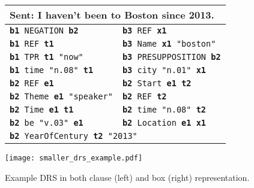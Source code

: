 \documentclass[11pt,a4paper]{article}
\newcommand{\clause}[1]{\texttt{#1}}
\newcommand{\disvar}[1]{\textbf{#1}}
\newcommand{\boxvar}[1]{\textbf{#1}}
\newcommand{\operator}[1]{#1}
\newcommand{\concept}[1]{#1}
\newcommand{\role}[1]{#1}
\begin{document}
\begin{figure*}[!t]
\captionsetup{singlelinecheck=false,justification=justified}
\begin{minipage}[t]{.25\linewidth}
\vspace{0pt}
\setlength{\tabcolsep}{2pt}
\centering
\footnotesize
\begin{tabular}{ll}
\toprule
\multicolumn{2}{l}{\small \textbf{Sent:} I haven't been to Boston since 2013.} \\
\midrule
\clause{\boxvar{b1} \operator{NEGATION} \boxvar{b2}}      &\clause{\boxvar{b3} \operator{REF} \disvar{x1}}    \\
\clause{\boxvar{b1} \operator{REF} \disvar{t1}}    &\clause{\boxvar{b3} \role{Name} \disvar{x1} "boston"}    \\
\clause{\boxvar{b1} \operator{TPR} \disvar{t1} "now"}  &   \clause{\boxvar{b3} \operator{PRESUPPOSITION} \boxvar{b2}}    \\
\clause{\boxvar{b1} \concept{time} "n.08" \disvar{t1}}  &  \clause{\boxvar{b3} \concept{city} "n.01" \disvar{x1}}    \\
\clause{\boxvar{b2} \operator{REF} \disvar{e1}}    &\clause{\boxvar{b2} \role{Start} \disvar{e1} \disvar{t2} }    \\
\clause{\boxvar{b2} \role{Theme} \disvar{e1} "speaker"}  &   \clause{\boxvar{b2} \operator{REF} \disvar{t2}}    \\
\clause{\boxvar{b2} \role{Time} \disvar{e1} \disvar{t1}}  &  \clause{\boxvar{b2} \concept{time "n.08"} \disvar{t2}}    \\
\clause{\boxvar{b2} \concept{be} "v.03" \disvar{e1}}    & \clause{\boxvar{b2} \role{Location} \disvar{e1} \disvar{x1}} \\ 
\multicolumn{2}{l}{\clause{\boxvar{b2} \role{YearOfCentury} \disvar{t2} "2013"}}  \\
\bottomrule
\end{tabular}
\end{minipage}\begin{minipage}[t]{.75\linewidth}
\vspace{0.01cm}
\centering
\texttt{[image: smaller\_drs\_example.pdf]}
\end{minipage}

\vspace{-0.3cm}
\caption{\label{fig:clauses}\label{fig:drs}Example DRS in both clause (left) and box (right) representation.}
\vspace{-0.3cm}
\end{figure*}
\end{document}

